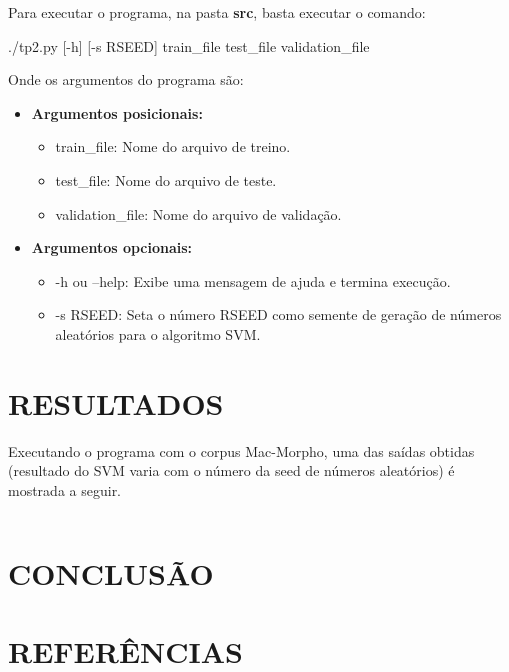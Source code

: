 \documentclass[12pt]{article}
\begin{document}
Para executar o programa, na pasta \textbf{src}, basta executar o comando:

\begin{center}
	./tp2.py [-h] [-s RSEED] train\_file test\_file validation\_file
\end{center}

Onde os argumentos do programa são:

\begin{itemize}
	\item \textbf{Argumentos posicionais:}

	\begin{itemize}
		\item train\_file: Nome do arquivo de treino.
		\item test\_file: Nome do arquivo de teste.
		\item validation\_file: Nome do arquivo de validação.
	\end{itemize}

	\item \textbf{Argumentos opcionais:}

	\begin{itemize}
		\item -h ou --help: Exibe uma mensagem de ajuda e termina execução.
		\item -s RSEED: Seta o número RSEED como semente de geração de números
		aleatórios para o algoritmo SVM.
	\end{itemize}
\end{itemize}

\section{RESULTADOS}

Executando o programa com o corpus Mac-Morpho, uma das saídas obtidas (resultado
do SVM varia com o número da seed de números aleatórios) é mostrada a seguir.

\begin{mdframed}[linecolor=black, leftline=false, rightline=false]
    \inputminted[linenos, fontsize=\footnotesize]{text}{../src/out.txt}
\end{mdframed}



\section{CONCLUSÃO}



\section{REFERÊNCIAS}



\end{document}
